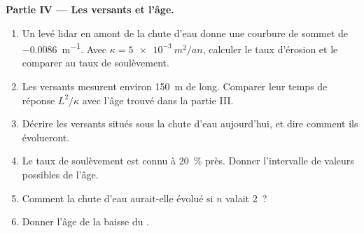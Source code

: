 \begin{problem}
\medskip\noindent\textbf{Partie IV --- Les versants et l'âge.}
\begin{enumerate}[resume]
\item Un levé lidar en amont de la chute d'eau donne une courbure de sommet de
  \qty{-0.0086}{m^{-1}}. Avec $\kappa = \qty{5e-3}{m^2/an}$, calculer le
  taux d'érosion et le comparer au taux de soulèvement.
\item Les versants mesurent environ \qty{150}{m} de long. Comparer leur temps de réponse
  $L^2/\kappa$ avec l'âge trouvé dans la partie III.
\item Décrire les versants situés sous la chute d'eau aujourd'hui, et dire comment ils
  évolueront.
\item Le taux de soulèvement est connu à \qty{20}{\percent} près. Donner l'intervalle de
  valeurs possibles de l'âge.
\item Comment la chute d'eau aurait-elle évolué si $n$ valait 2~?
\item Donner l'âge de la baisse du .
\end{enumerate}
\end{problem}
